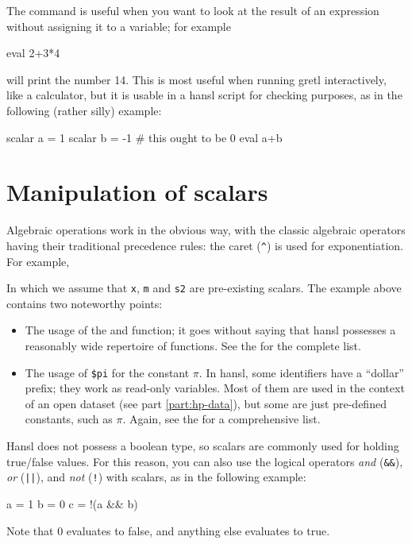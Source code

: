 The  command is useful when you want to look at the result
of an expression without assigning it to a variable; for example
\begin{code}
  eval 2+3*4
\end{code}
will print the number 14. This is most useful when running gretl
interactively, like a calculator, but it is usable in a hansl script
for checking purposes, as in the following (rather silly) example:
\begin{code}
  scalar a = 1
  scalar b = -1
  # this ought to be 0
  eval a+b
\end{code}

\section{Manipulation of scalars}

Algebraic operations work in the obvious way, with the classic
algebraic operators having their traditional precedence rules: the
caret (\verb|^|) is used for exponentiation. For example,
In which we assume that \texttt{x}, \texttt{m} and \texttt{s2} are
pre-existing scalars. The example above contains two noteworthy
points:
\begin{itemize}
\item The usage of the  and  function; it goes
  without saying that hansl possesses a reasonably wide repertoire of
  functions. See the \GCR{} for the complete list.
\item The usage of \verb|$pi| for the constant $\pi$. In hansl, some
  identifiers have a ``dollar'' prefix; they work as read-only
  variables. Most of them are used in the context of an open dataset
  (see part \ref{part:hp-data}), but some are just pre-defined
  constants, such as $\pi$. Again, see the \GCR{} for a comprehensive
  list.
\end{itemize}

Hansl does not possess a boolean type, so scalars are commonly used
for holding true/false values. For this reason, you can also use
the logical operators \emph{and} (\verb|&&|), \emph{or} (\verb+||+),
and \emph{not} (\verb|!|) with scalars, as in the following example:
\begin{code}
  a = 1
  b = 0
  c = !(a && b)
\end{code}
Note that 0 evaluates to false, and anything else evaluates to
true.

